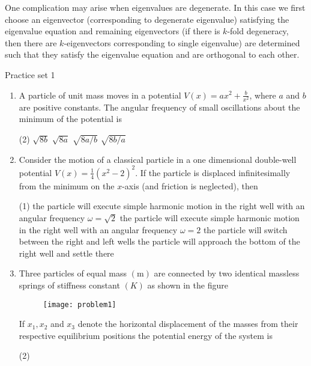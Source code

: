  One complication may arise when eigenvalues are degenerate. In this case we first choose an eigenvector (corresponding to degenerate eigenvalue) satisfying the eigenvalue equation and remaining eigenvectors (if there is $k$-fold degeneracy, then there are $k$-eigenvectors corresponding to single eigenvalue) are determined such that they satisfy the eigenvalue equation and are orthogonal to each other.
 \newpage
 \begin{abox}
 	Practice set 1
 	\end{abox}
 \begin{enumerate}
 		\item  A particle of unit mass moves in a potential $V(x)=a x^{2}+\frac{b}{x^{2}}$, where $a$ and $b$ are positive constants. The angular frequency of small oscillations about the minimum of the potential is
 		{}
 	\begin{tasks}(2)
 		\task[\textbf{A.}] $\sqrt{8 b}$
 		\task[\textbf{B.}]$\sqrt{8 a}$
 		\task[\textbf{C.}] $\sqrt{8 a / b}$
 		\task[\textbf{D.}]$\sqrt{8 b / a}$
 	\end{tasks}
 	\item Consider the motion of a classical particle in a one dimensional double-well potential $V(x)=\frac{1}{4}\left(x^{2}-2\right)^{2} .$ If the particle is displaced infinitesimally from the minimum on the $x$-axis (and friction is neglected), then
 	{}
 \begin{tasks}(1)
 	\task[\textbf{A.}] the particle will execute simple harmonic motion in the right well with an angular frequency $\omega=\sqrt{2}$
 	\task[\textbf{B.}]the particle will execute simple harmonic motion in the right well with an angular frequency $\omega=2$
 	\task[\textbf{C.}]the particle will switch between the right and left wells
 	\task[\textbf{D.}]the particle will approach the bottom of the right well and settle there
 \end{tasks}
	\item Three particles of equal mass $(\mathrm{m})$ are connected by two identical massless springs of stiffness constant $(K)$ as shown in the figure\\
	\begin{figure}[H]
		\centering
		\texttt{[image: problem1]}
	\end{figure}
	If $x_{1}, x_{2}$ and $x_{3}$ denote the horizontal displacement of the masses from their respective equilibrium positions the potential energy of the system is
	{}
\begin{tasks}(2)

\end{tasks}
\end{enumerate}

